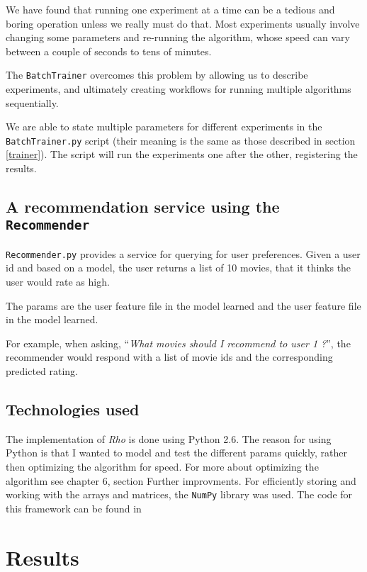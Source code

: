 \documentclass[10pt,a4paper]{article}  %
\begin{document}
We have found that running one experiment at a time can be a tedious and boring operation unless we really must do that. Most experiments usually involve changing some parameters and re-running the algorithm, whose speed can vary between a couple of seconds to tens of minutes. 

The \texttt{BatchTrainer} overcomes this problem by allowing us to describe experiments, and ultimately creating workflows for running multiple algorithms sequentially. 

We are able to state multiple parameters for different experiments in the \texttt{BatchTrainer.py} script (their meaning is the same as those described in section \ref{trainer}). The script will run the experiments one after the other, registering the results. 

\subsection{A recommendation service using the \texttt{Recommender}}

\texttt{Recommender.py} provides a service for querying for user preferences. Given a user id and based on a model, the user returns a list of 10 movies, that it thinks the user would rate as high. 

The params are the user feature file in the model learned and the user feature file in the model learned.

For example, when asking, ``\emph{What movies should I recommend to user 1 ?}'', the recommender would respond with a list of movie ids and the corresponding predicted rating.

\subsection{Technologies used}
\label{tehcnologies}

The implementation of \emph{Rho} is done using Python 2.6. The reason for using Python is that I wanted to model and test the different params quickly, rather then optimizing the algorithm for speed. For more about optimizing the algorithm see chapter 6, section Further improvments. For efficiently storing and working with the arrays and matrices, the \texttt{NumPy} library \cite{numpy} was used. The code for this framework can be found in \cite{rho}


\section{Results}
\end{document}
